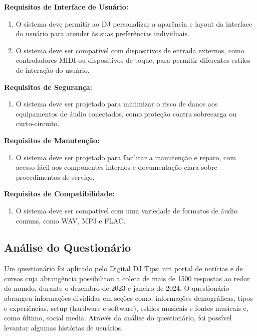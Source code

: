 \textbf{Requisitos de Interface de Usuário:}
\begin{enumerate}[label=\textbullet]
\item O sistema deve permitir ao DJ personalizar a aparência e layout da interface do usuário para atender às suas preferências individuais.
\item O sistema deve ser compatível com dispositivos de entrada externos, como controladores MIDI ou dispositivos de toque, para permitir diferentes estilos de interação do usuário.
\end{enumerate}

\textbf{Requisitos de Segurança:}
\begin{enumerate}[label=\textbullet]
\item O sistema deve ser projetado para minimizar o risco de danos aos equipamentos de áudio conectados, como proteção contra sobrecarga ou curto-circuito.
\end{enumerate}

\textbf{Requisitos de Manutenção:}
\begin{enumerate}[label=\textbullet]
\item O sistema deve ser projetado para facilitar a manutenção e reparo, com acesso fácil aos componentes internos e documentação clara sobre procedimentos de serviço.
\end{enumerate}

\textbf{Requisitos de Compatibilidade:}
\begin{enumerate}[label=\textbullet]
\item O sistema deve ser compatível com uma variedade de formatos de áudio comuns, como WAV, MP3 e FLAC.
\end{enumerate}

\subsection{Análise do Questionário}

Um questionário foi aplicado pelo Digital DJ Tips; um portal de notícias e de cursos cuja abrangência possibilitou a coleta de mais de 1500 respostas ao redor do mundo, durante o dezembro de 2023 e janeiro de 2024. O questionário abrangeu informações divididas em seções como: informações demográficas, tipos e experiências, setup (hardware e software), estilos musicais e fontes musicais e, como último, social media. Através da análise do questionário, foi possível levantar algumas histórias de usuários. 

